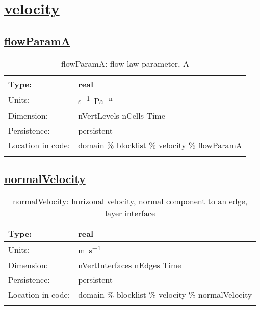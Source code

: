 \section[velocity]{\hyperref[sec:var_tab_velocity]{velocity}}
\label{sec:var_sec_velocity}
\subsection[flowParamA]{\hyperref[sec:var_tab_velocity]{flowParamA}}
\label{subsec:var_sec_velocity_flowParamA}
\begin{center}
\begin{longtable}{| p{2.0in} | p{4.0in} |}
        \hline 
        Type: & real \\
        \hline 
        Units: & \si{s^{-1}.Pa^{-n}} \\
        \hline 
        Dimension: & nVertLevels nCells Time \\
        \hline 
        Persistence: & persistent \\
        \hline 
         Location in code: & domain \% blocklist \% velocity \% flowParamA \\
         \hline 
    \caption{flowParamA: flow law parameter, A}
\end{longtable}
\end{center}
\subsection[normalVelocity]{\hyperref[sec:var_tab_velocity]{normalVelocity}}
\label{subsec:var_sec_velocity_normalVelocity}
\begin{center}
\begin{longtable}{| p{2.0in} | p{4.0in} |}
        \hline 
        Type: & real \\
        \hline 
        Units: & \si{m.s^{-1}} \\
        \hline 
        Dimension: & nVertInterfaces nEdges Time \\
        \hline 
        Persistence: & persistent \\
        \hline 
         Location in code: & domain \% blocklist \% velocity \% normalVelocity \\
         \hline 
    \caption{normalVelocity: horizonal velocity, normal component to an edge, layer interface}
\end{longtable}
\end{center}
